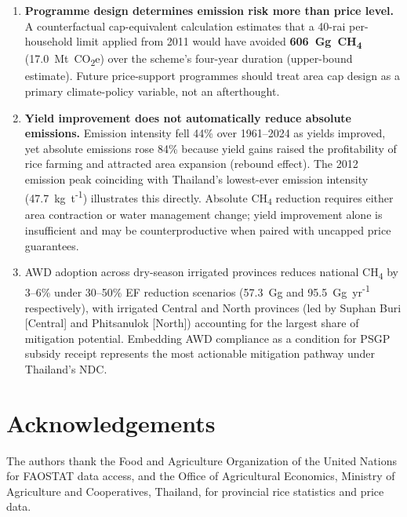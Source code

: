 \documentclass[fleqn,10pt]{olplainarticle}
\begin{document}
\begin{enumerate}[noitemsep]
  \item \textbf{Programme design determines emission risk more than price level.}
        A counterfactual cap-equivalent calculation estimates that a 40-rai
        per-household limit applied from 2011 would have avoided
        \textbf{606~Gg~CH\textsubscript{4}} (17.0~Mt~CO\textsubscript{2}e)
        over the scheme's four-year duration (upper-bound estimate).
        Future price-support programmes should treat area cap design as a
        primary climate-policy variable, not an afterthought.

  \item \textbf{Yield improvement does not automatically reduce absolute emissions.}
        Emission intensity fell 44\% over 1961--2024 as yields improved, yet
        absolute emissions rose 84\% because yield gains raised the profitability
        of rice farming and attracted area expansion (rebound effect).
        The 2012 emission peak coinciding with Thailand's lowest-ever emission
        intensity (47.7~kg~t\textsuperscript{-1}) illustrates this directly.
        Absolute CH\textsubscript{4} reduction requires either area contraction
        or water management change; yield improvement alone is insufficient and
        may be counterproductive when paired with uncapped price guarantees.

  \item AWD adoption across dry-season irrigated provinces reduces national
        CH\textsubscript{4} by 3--6\% under 30--50\% EF reduction scenarios
        (57.3~Gg and 95.5~Gg~yr\textsuperscript{-1} respectively),
        with irrigated Central and North provinces (led by Suphan Buri [Central]
        and Phitsanulok [North]) accounting for the largest share of
        mitigation potential.
        Embedding AWD compliance as a condition for PSGP subsidy receipt
        represents the most actionable mitigation pathway under Thailand's NDC.
\end{enumerate}

\section*{Acknowledgements}

The authors thank the Food and Agriculture Organization of the United Nations
for FAOSTAT data access, and the Office of Agricultural Economics, Ministry of
Agriculture and Cooperatives, Thailand, for provincial rice statistics and
price data.
\end{document}
